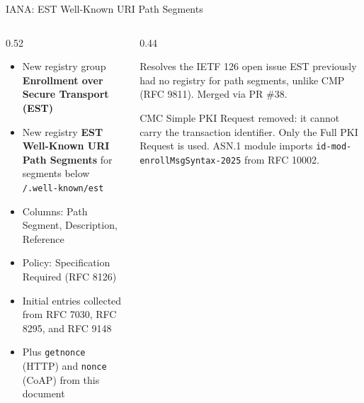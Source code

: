 \documentclass[aspectratio=169,10pt]{beamer}
\begin{document}
\begin{frame}{IANA: EST Well-Known URI Path Segments}
  \begin{columns}[T,onlytextwidth]
    \begin{column}{0.52\textwidth}
      \begin{itemize}
        \item New registry group \textbf{Enrollment over Secure Transport (EST)}
        \item New registry \textbf{EST Well-Known URI Path Segments}
              for segments below \texttt{/.well-known/est}
        \item Columns: Path Segment, Description, Reference
        \item Policy: Specification Required (RFC 8126)
        \item Initial entries collected from RFC 7030, RFC 8295, and RFC 9148
        \item Plus \texttt{getnonce} (HTTP) and \texttt{nonce} (CoAP) from this document
      \end{itemize}
    \end{column}
    \begin{column}{0.44\textwidth}
      \begin{block}{Resolves the IETF 126 open issue}
        EST previously had no registry for path segments, unlike CMP
        (RFC 9811). Merged via PR \#38.
      \end{block}
      \vspace{0.2cm}
      \begin{block}{CMC}
        Simple PKI Request removed: it cannot carry the transaction
        identifier. Only the Full PKI Request is used. ASN.1 module imports
        \texttt{id-mod-enrollMsgSyntax-2025} from RFC 10002.
      \end{block}
    \end{column}
  \end{columns}
\end{frame}
\end{document}
